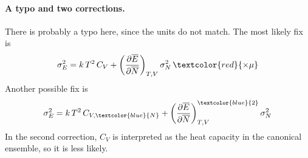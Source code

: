 \documentclass[twocolumn, 10pt]{article}
\numberwithin{equation}{section}
\begin{document}
\paragraph*{A typo and two corrections.}

There is probably a typo here, since the units do not match.
%
The most likely fix is
\begin{equation}
  \sigma_E^2 = k \, T^2 \, C_V
  + \left( \frac{\partial \overline E }
                { \partial \overline N} \right)_{T, V}
    \sigma_N^2 \, \textcolor{red}{\times \mu}
  \label{eq:prob3-22a}
\end{equation}
%
Another possible fix is
%
\begin{equation}
  \sigma_E^2 = k \, T^2 \, C_{V,\textcolor{blue}{N}}
  + \left( \frac{\partial \overline E }
                { \partial \overline N} \right)_{T, V}^{\textcolor{blue}{2}}
    \sigma_N^2
  \label{eq:prob3-22b}
\end{equation}
%
In the second correction,
$C_V$ is interpreted as the heat capacity in the canonical ensemble,
so it is less likely.
\end{document}
